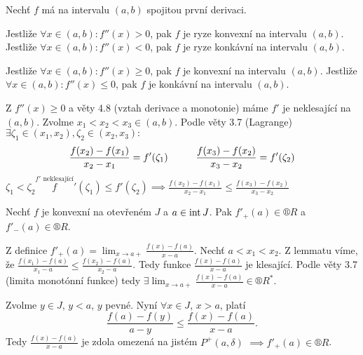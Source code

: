 \documentclass[12pt]{article}					%
\begin{document}
        \begin{veta}
            Nechť $f$ má na intervalu $(a, b)$ spojitou první derivaci.

            Jestliže $\forall x \in (a, b): f''(x)>0$, pak $f$ je ryze konvexní na intervalu $(a, b)$. Jestliže $\forall x \in (a, b): f''(x)<0$, pak $f$ je ryze konkávní na intervalu $(a, b)$.

            Jestliže $\forall x \in (a, b): f''(x)≥0$, pak $f$ je konvexní na intervalu $(a, b)$. Jestliže $\forall x \in (a, b): f''(x)≤0$, pak $f$ je konkávní na intervalu $(a, b)$.

            \begin{dukazin}
                    Z $f''(x)≥0$ a věty 4.8 (vztah derivace a monotonie) máme $f'$ je neklesající na $(a, b)$. Zvolme $x_1 < x_2 < x_3 \in (a, b)$. Podle věty 3.7 (Lagrange) $\exists \zeta_1 \in (x_1, x_2), \zeta_2 \in (x_2, x_3):$
                $$ \frac{f(x_2) - f(x_1)}{x_2 - x_1} = f'(\zeta_1) \hskip 1cm  \frac{f(x_3) - f(x_2)}{x_3 - x_2} = f'(\zeta_2) $$ 
                $\zeta_1 < \zeta_2 \overset{f'\text{ neklesající}} f'(\zeta_1)≤f'(\zeta_2) \implies \frac{f(x_2) - f(x_1)}{x_2 - x_1} ≤ \frac{f(x_3) - f(x_2)}{x_3 - x_2}$
            \end{dukazin}
        \end{veta}

        \begin{veta}
            Nechť $f$ je konvexní na otevřeném $J$ a $a \in \operatorname{int} J$. Pak $f'_+(a) \in ®R$ a $f'_-(a) \in ®R$.

            \begin{dukazin}
                Z definice $f'_+(a) = \lim_{x \rightarrow a+} \frac{f(x) - f(a)}{x - a}$. Nechť $a < x_1 < x_2$. Z lemmatu víme, že $\frac{f(x_1) - f(a)}{x_1 - a} ≤ \frac{f(x_2) - f(a)}{x_2 - a}$. Tedy funkce $\frac{f(x) - f(a)}{x - a}$ je klesající. Podle věty 3.7 (limita monotónní funkce) tedy $\exists \lim_{x \rightarrow a+} \frac{f(x) - f(a)}{x-a} \in ®R^*$.

                Zvolme $y \in J$, $y<a$, $y$ pevné. Nyní $\forall x \in J$, $x > a$, platí
                $$ \frac{f(a) - f(y)}{a - y} ≤ \frac{f(x) - f(a)}{x - a}. $$ 
                Tedy $\frac{f(x) - f(a)}{x - a}$ je zdola omezená na jistém $P^+(a, \delta)$ $\implies f'_+(a) \in ®R$.
            \end{dukazin}
        \end{veta}
\end{document}
